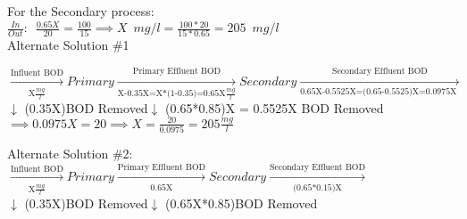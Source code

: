 \begin{enumerate}
\begin{figure}[!h]
\centering
{}
\end{figure}
\vspace{0.3cm}
For the Secondary process:\\
$\frac{In}{Out}: \enspace \frac{0.65X}{20}=\frac{100}{15} \implies X \enspace mg/l=\frac{100*20}{15*0.65}=\boxed{205 \enspace mg/l}$\\

\vspace{0.3cm}
Alternate Solution \#1

$\xrightarrow[
				\text{X}\frac{mg}{l}
			]
			{
			\text{Influent BOD}
			}
 \boxed{Primary}
 \xrightarrow[
 				\text{X-0.35X=X*(1-0.35)=0.65X}\frac{mg}{l}
 			]
 			{
 			\text{Primary Effluent BOD}
 			}
 \boxed{Secondary}
 \xrightarrow[
				\text{0.65X-0.5525X=(0.65-0.5525)X=0.0975X }
			 ]
			{
			\text{Secondary Effluent BOD}
			}
$\\
\hspace{2.8cm}$\downarrow$ {\tiny(0.35X)BOD Removed}\hspace{3.2cm}$\downarrow$ {\tiny(0.65*0.85)X = 0.5525X BOD Removed}\\
$\implies 0.0975X=20 \implies X=\frac{20}{0.0975}=\boxed{205\frac{mg}{l}}$\\

\vspace{0.3cm}

Alternate Solution \#2:\\
$\xrightarrow[\text{X}\frac{mg}{l}]{\text{Influent BOD}}\boxed{Primary}\xrightarrow[\text{0.65X}]{\text{Primary Effluent BOD}}\boxed{Secondary}\xrightarrow[\text{(0.65*0.15)X}]{\text{Secondary Effluent BOD}}$\\
\hspace{2.8cm}$\downarrow$ {\tiny(0.35X)BOD Removed}\hspace{2.2cm}$\downarrow$ {\tiny(0.65X*0.85)BOD Removed}\\


\end{enumerate}
